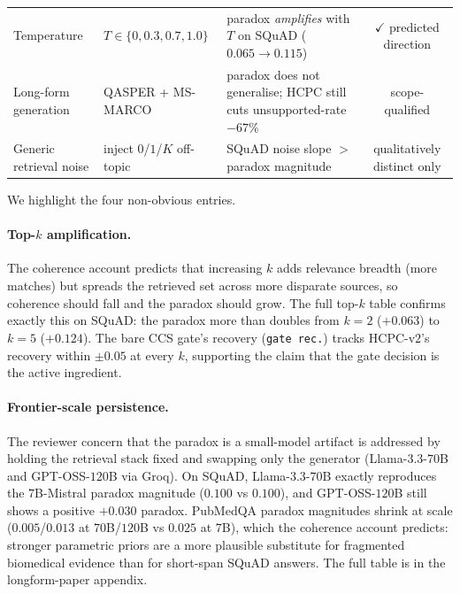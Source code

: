 \begin{table}[!htb]
\begin{tabular}{lllc}
Temperature             & $T \in \{0, 0.3, 0.7, 1.0\}$        & paradox \emph{amplifies} with $T$ on SQuAD ($0.065 \to 0.115$)      & $\checkmark$ predicted direction \\
Long-form generation    & QASPER + MS-MARCO                   & paradox does not generalise; HCPC still cuts unsupported-rate $-67\%$ & \dag{} scope-qualified \\
Generic retrieval noise & inject $0$/$1$/$K$ off-topic        & SQuAD noise slope $> $ paradox magnitude                            & \dag{} qualitatively distinct only \\
\bottomrule
\end{tabular}
\end{table}

We highlight the four non-obvious entries.

\paragraph{Top-$k$ amplification.}

The coherence account predicts that increasing $k$ adds relevance
breadth (more matches) but spreads the retrieved set across more
disparate sources, so coherence should fall and the paradox should
grow. The full top-$k$ table confirms exactly this on SQuAD: the
paradox more than doubles from $k{=}2$ ($+0.063$) to $k{=}5$
($+0.124$). The bare CCS gate's recovery (\texttt{gate rec.}) tracks
HCPC-v$2$'s recovery within $\pm 0.05$ at every $k$, supporting the
claim that the gate decision is the active ingredient.

\paragraph{Frontier-scale persistence.}
The reviewer concern that the paradox is a small-model artifact is
addressed by holding the retrieval stack fixed and swapping only the
generator (Llama-$3.3$-$70$B and GPT-OSS-$120$B via Groq). On SQuAD,
Llama-$3.3$-$70$B exactly reproduces the $7$B-Mistral paradox magnitude
($0.100$ vs $0.100$), and GPT-OSS-$120$B still shows a positive
$+0.030$ paradox. PubMedQA paradox magnitudes shrink at scale
($0.005$/$0.013$ at $70$B/$120$B vs $0.025$ at $7$B), which the
coherence account predicts: stronger parametric priors are a more
plausible substitute for fragmented biomedical evidence than for
short-span SQuAD answers. The full table is in
the longform-paper appendix.

